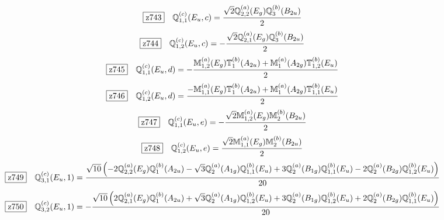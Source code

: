 \documentclass[fleqn,10pt,landscape]{jsarticle}
\begin{document}
\begin{dmath*}
\hspace*{3mm}\fbox{z743}\quad \mathbb{Q}_{1,1}^{(c)}(E_{u},c)=\frac{\sqrt{2} \mathbb{Q}_{2,2}^{(a)}(E_{g}) \mathbb{Q}_{3}^{(b)}(B_{2u})}{2}
\end{dmath*}
\begin{dmath*}
\hspace*{3mm}\fbox{z744}\quad \mathbb{Q}_{1,2}^{(c)}(E_{u},c)=- \frac{\sqrt{2} \mathbb{Q}_{2,1}^{(a)}(E_{g}) \mathbb{Q}_{3}^{(b)}(B_{2u})}{2}
\end{dmath*}
\begin{dmath*}
\hspace*{3mm}\fbox{z745}\quad \mathbb{Q}_{1,1}^{(c)}(E_{u},d)=- \frac{\mathbb{M}_{1,2}^{(a)}(E_{g}) \mathbb{T}_{1}^{(b)}(A_{2u}) + \mathbb{M}_{1}^{(a)}(A_{2g}) \mathbb{T}_{1,2}^{(b)}(E_{u})}{2}
\end{dmath*}
\begin{dmath*}
\hspace*{3mm}\fbox{z746}\quad \mathbb{Q}_{1,2}^{(c)}(E_{u},d)=\frac{- \mathbb{M}_{1,1}^{(a)}(E_{g}) \mathbb{T}_{1}^{(b)}(A_{2u}) + \mathbb{M}_{1}^{(a)}(A_{2g}) \mathbb{T}_{1,1}^{(b)}(E_{u})}{2}
\end{dmath*}
\begin{dmath*}
\hspace*{3mm}\fbox{z747}\quad \mathbb{Q}_{1,1}^{(c)}(E_{u},e)=- \frac{\sqrt{2} \mathbb{M}_{1,2}^{(a)}(E_{g}) \mathbb{M}_{2}^{(b)}(B_{2u})}{2}
\end{dmath*}
\begin{dmath*}
\hspace*{3mm}\fbox{z748}\quad \mathbb{Q}_{1,2}^{(c)}(E_{u},e)=\frac{\sqrt{2} \mathbb{M}_{1,1}^{(a)}(E_{g}) \mathbb{M}_{2}^{(b)}(B_{2u})}{2}
\end{dmath*}
\begin{dmath*}
\hspace*{3mm}\fbox{z749}\quad \mathbb{Q}_{3,1}^{(c)}(E_{u},1)=\frac{\sqrt{10} \left(- 2 \mathbb{Q}_{2,2}^{(a)}(E_{g}) \mathbb{Q}_{1}^{(b)}(A_{2u}) - \sqrt{3} \mathbb{Q}_{2}^{(a)}(A_{1g}) \mathbb{Q}_{1,1}^{(b)}(E_{u}) + 3 \mathbb{Q}_{2}^{(a)}(B_{1g}) \mathbb{Q}_{1,1}^{(b)}(E_{u}) - 2 \mathbb{Q}_{2}^{(a)}(B_{2g}) \mathbb{Q}_{1,2}^{(b)}(E_{u})\right)}{20}
\end{dmath*}
\begin{dmath*}
\hspace*{3mm}\fbox{z750}\quad \mathbb{Q}_{3,2}^{(c)}(E_{u},1)=- \frac{\sqrt{10} \left(2 \mathbb{Q}_{2,1}^{(a)}(E_{g}) \mathbb{Q}_{1}^{(b)}(A_{2u}) + \sqrt{3} \mathbb{Q}_{2}^{(a)}(A_{1g}) \mathbb{Q}_{1,2}^{(b)}(E_{u}) + 3 \mathbb{Q}_{2}^{(a)}(B_{1g}) \mathbb{Q}_{1,2}^{(b)}(E_{u}) + 2 \mathbb{Q}_{2}^{(a)}(B_{2g}) \mathbb{Q}_{1,1}^{(b)}(E_{u})\right)}{20}
\end{dmath*}
\end{document}
